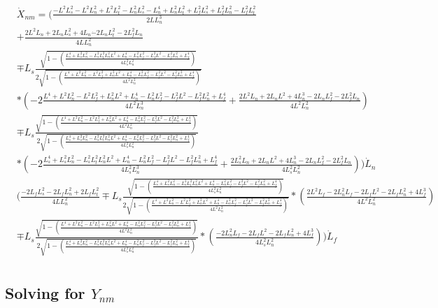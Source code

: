 \documentclass[11pt, landscape]{article}
\begin{document}
\[
\begin{aligned}
  &\dot{X}_{nm}  = \Bigg(\frac{-L^2L_s^2 - L^2L_n^2 + L^2L_t^2 - L_n^2L_s^2 - L_n^4 + L_n^2L_t^2 + L_f^2L_s^2 + L_f^2L_n^2 - L_f^2L_t^2}{2LL_{n}^3}\\
  &+ \frac{2L^2L_n + 2L_nL_s^2 + 4L_n\dot - 2L_nL_t^2 - 2L_f^2L_n}{4LL_{n}^2}\\
  &\mp L_s\frac{\sqrt{1-\left(\frac{L_s^4 + L_s^2L_n^2 - L_s^2L_t^2 L_n^2L^2 + L_n^4 - L_n^2L_f^2 - L_f^2L^2 - L_f^2L_n^2 + L_f^4}{4L_{s}^2L_{n}^2}\right)}}{2\sqrt{1 - \left(\frac{L^4 + L^2L_n^2 - L^2L_f^2 + L_n^2L^2 + L_n^4 - L_n^2L_f^2 - L_f^2L^2 - L_f^2L_n^2 + L_f^4}{4L^2L_{n}^2}\right)}}\\
  &*\left(-2\frac{L^4 + L^2L_n^2 - L^2L_f^2 + L_n^2L^2 + L_n^4 - L_n^2L_f^2 - L_f^2L^2 - L_f^2L_n^2 + L_f^4}{4L^2L_{n}^3} + \frac{2L^2L_n + 2L_nL^2 + 4L_n^3 - 2L_nL_f^2 - 2L_f^2L_n}{4L^2L_{n}^2}\right)\\
  &\mp L_s\frac{\sqrt{1 - \left(\frac{L^4 + L^2L_n^2 - L^2L_f^2 + L_n^2L^2 + L_n^4 - L_n^2L_f^2 - L_f^2L^2 - L_f^2L_n^2 + L_f^4}{4L^2L_{n}^2}\right)}}{2\sqrt{1-\left(\frac{L_s^4 + L_s^2L_n^2 - L_s^2L_t^2 L_n^2L^2 + L_n^4 - L_n^2L_f^2 - L_f^2L^2 - L_f^2L_n^2 + L_f^4}{4L_{s}^2L_{n}^2}\right)}}\\
  &*\left(-2\frac{L_s^4 + L_s^2L_n^2 - L_s^2L_t^2 L_n^2L^2 + L_n^4 - L_n^2L_f^2 - L_f^2L^2 - L_f^2L_n^2 + L_f^4}{4L_{s}^2L_{n}^3} + \frac{2L_s^2L_n + 2L_nL^2 + 4L_n^3 - 2L_nL_f^2 - 2L_f^2L_n}{4L_{s}^2L_{n}^2}\right)\Bigg)\dot{L}_n\\
  &\Bigg(\frac{-2L_fL_s^2 - 2L_fL_n^2 + 2L_fL_t^2}{4LL_{n}^2}
  \mp L_s\frac{\sqrt{1-\left(\frac{L_s^4 + L_s^2L_n^2 - L_s^2L_t^2 L_n^2L^2 + L_n^4 - L_n^2L_f^2 - L_f^2L^2 - L_f^2L_n^2 + L_f^4}{4L_{s}^2L_{n}^2}\right)}}{2\sqrt{1 - \left(\frac{L^4 + L^2L_n^2 - L^2L_f^2 + L_n^2L^2 + L_n^4 - L_n^2L_f^2 - L_f^2L^2 - L_f^2L_n^2 + L_f^4}{4L^2L_{n}^2}\right)}}
  *\left(\frac{2L^2L_f - 2L_n^2L_f - 2L_fL^2 - 2L_fL_n^2 + 4L_f^3}{4L^2L_{n}^2}\right)\\
  &\mp L_s\frac{\sqrt{1 - \left(\frac{L^4 + L^2L_n^2 - L^2L_f^2 + L_n^2L^2 + L_n^4 - L_n^2L_f^2 - L_f^2L^2 - L_f^2L_n^2 + L_f^4}{4L^2L_{n}^2}\right)}}{2\sqrt{1-\left(\frac{L_s^4 + L_s^2L_n^2 - L_s^2L_t^2 L_n^2L^2 + L_n^4 - L_n^2L_f^2 - L_f^2L^2 - L_f^2L_n^2 + L_f^4}{4L_{s}^2L_{n}^2}\right)}}
  *\left(\frac{-2L_n^2L_f - 2L_fL^2 - 2L_fL_n^2 + 4L_f^3}{4L_{s}^2L_{n}^2}\right)\Bigg)\dot{L}_f\\
\end{aligned}
\]

\subsection{Solving for $Y_{nm}$}
\end{document}
